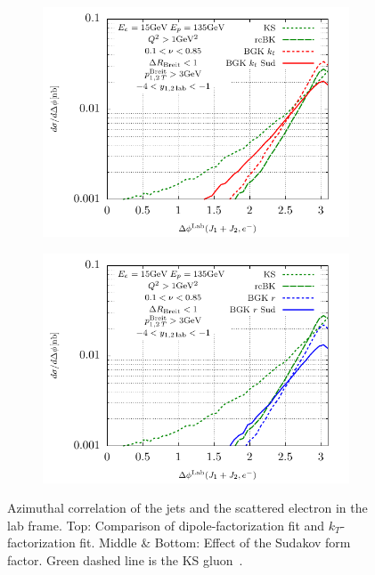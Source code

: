 \documentclass[12pt]{article}
\numberwithin{equation}{section}
\numberwithin{table}{section}
\numberwithin{figure}{section}
\begin{document}
\begin{figure}[p]
	\begin{subfigure}{0.5\textwidth}
		\includegraphics[width=\textwidth]{plots/plotBGK2Lab}
	\end{subfigure}
	\begin{subfigure}{0.5\textwidth}
		\includegraphics[width=\textwidth]{plots/plotBGK3Lab}
	\end{subfigure}
\caption{\footnotesize Azimuthal correlation of the jets and the scattered electron in the lab frame. Top: Comparison of dipole-factorization fit and $k_T$-factorization fit. Middle \& Bottom: Effect of the Sudakov form factor.  Green dashed line is the KS gluon~\cite{vanHameren:2021sqc}.}
\label{fig:je-lab}
\end{figure}
\end{document}
